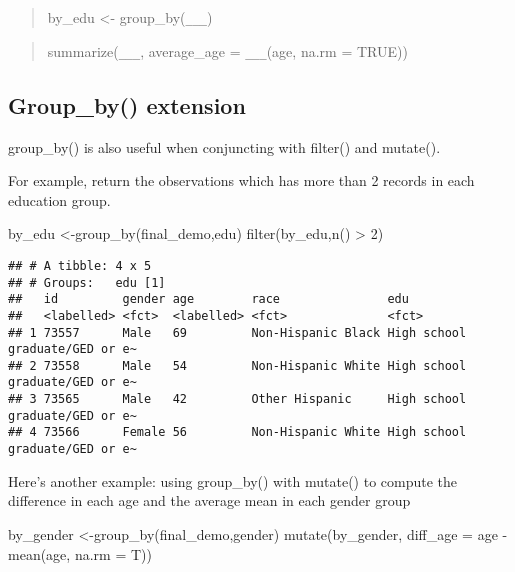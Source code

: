 \documentclass[
]{book}
\newenvironment{Shaded}{\begin{snugshade}}{\end{snugshade}}
\newcommand{\AttributeTok}[1]{\textcolor[rgb]{0.77,0.63,0.00}{#1}}
\newcommand{\DecValTok}[1]{\textcolor[rgb]{0.00,0.00,0.81}{#1}}
\newcommand{\FunctionTok}[1]{\textcolor[rgb]{0.00,0.00,0.00}{#1}}
\newcommand{\NormalTok}[1]{#1}
\newcommand{\OtherTok}[1]{\textcolor[rgb]{0.56,0.35,0.01}{#1}}
\newcommand{\SpecialCharTok}[1]{\textcolor[rgb]{0.00,0.00,0.00}{#1}}
\begin{document}
\begin{quote}
by\_edu \textless- group\_by(\texttt{\_\_\_})
\end{quote}

\begin{quote}
summarize(\texttt{\_\_\_}, average\_age = \texttt{\_\_\_}(age, na.rm = TRUE))
\end{quote}

\hypertarget{group_by-extension}{%
\subsection{Group\_by() extension}\label{group_by-extension}}

group\_by() is also useful when conjuncting with filter() and mutate().

For example, return the observations which has more than 2 records in each education group.

\begin{Shaded}
\begin{Highlighting}[]
\NormalTok{by\_edu }\OtherTok{\textless{}{-}}\FunctionTok{group\_by}\NormalTok{(final\_demo,edu)}
\FunctionTok{filter}\NormalTok{(by\_edu,}\FunctionTok{n}\NormalTok{() }\SpecialCharTok{\textgreater{}} \DecValTok{2}\NormalTok{)}
\end{Highlighting}
\end{Shaded}

\begin{verbatim}
## # A tibble: 4 x 5
## # Groups:   edu [1]
##   id         gender age        race               edu                           
##   <labelled> <fct>  <labelled> <fct>              <fct>                         
## 1 73557      Male   69         Non-Hispanic Black High school graduate/GED or e~
## 2 73558      Male   54         Non-Hispanic White High school graduate/GED or e~
## 3 73565      Male   42         Other Hispanic     High school graduate/GED or e~
## 4 73566      Female 56         Non-Hispanic White High school graduate/GED or e~
\end{verbatim}

Here's another example: using group\_by() with mutate() to compute the difference in each age and the average mean in each gender group

\begin{Shaded}
\begin{Highlighting}[]
\NormalTok{by\_gender }\OtherTok{\textless{}{-}}\FunctionTok{group\_by}\NormalTok{(final\_demo,gender)}
\FunctionTok{mutate}\NormalTok{(by\_gender,}
      \AttributeTok{diff\_age =}\NormalTok{ age }\SpecialCharTok{{-}} \FunctionTok{mean}\NormalTok{(age, }\AttributeTok{na.rm =}\NormalTok{ T))}
\end{Highlighting}
\end{Shaded}
\end{document}
